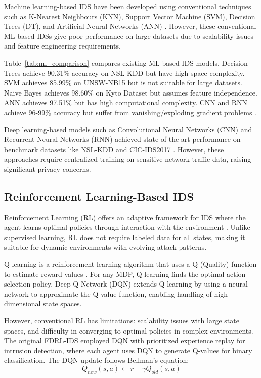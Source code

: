 \documentclass[conference]{IEEEtran}
\begin{document}
Machine learning-based IDS have been developed using conventional techniques such as K-Nearest Neighbours (KNN), Support Vector Machine (SVM), Decision Trees (DT), and Artificial Neural Networks (ANN) \cite{ml_basics}. However, these conventional ML-based IDSs give poor performance on large datasets due to scalability issues and feature engineering requirements.

Table~\ref{tab:ml_comparison} compares existing ML-based IDS models. Decision Trees achieve 90.31\% accuracy on NSL-KDD but have high space complexity. SVM achieves 85.99\% on UNSW-NB15 but is not suitable for large datasets. Naive Bayes achieves 98.60\% on Kyto Dataset but assumes feature independence. ANN achieves 97.51\% but has high computational complexity. CNN and RNN achieve 96-99\% accuracy but suffer from vanishing/exploding gradient problems \cite{deep_rl_hands_on}.

Deep learning-based models such as Convolutional Neural Networks (CNN) and Recurrent Neural Networks (RNN) achieved state-of-the-art performance on benchmark datasets like NSL-KDD \cite{nslkdd} and CIC-IDS2017 \cite{cic_ids}. However, these approaches require centralized training on sensitive network traffic data, raising significant privacy concerns.

\subsection{Reinforcement Learning-Based IDS}

Reinforcement Learning (RL) offers an adaptive framework for IDS where the agent learns optimal policies through interaction with the environment \cite{rl_book}. Unlike supervised learning, RL does not require labeled data for all states, making it suitable for dynamic environments with evolving attack patterns.

Q-learning is a reinforcement learning algorithm that uses a Q (Quality) function to estimate reward values \cite{dqn, rl_book}. For any MDP, Q-learning finds the optimal action selection policy. Deep Q-Network (DQN) extends Q-learning by using a neural network to approximate the Q-value function, enabling handling of high-dimensional state spaces.

However, conventional RL has limitations: scalability issues with large state spaces, and difficulty in converging to optimal policies in complex environments. The original FDRL-IDS \cite{original_paper} employed DQN with prioritized experience replay for intrusion detection, where each agent uses DQN to generate Q-values for binary classification. The DQN update follows Bellman's equation:
\begin{equation}
Q_{new}(s, a) \leftarrow r + \gamma Q_{old}(s, a)
\end{equation}
\end{document}

